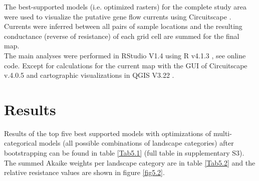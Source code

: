 \documentclass[10pt, twoside]{book} %
\begin{document}
		The best-supported models (i.e. optimized rasters) for the complete study area were used to visualize the putative gene flow currents using Circuitscape \citep{mcrae2013, kimmig2020}. Currents were inferred between all pairs of sample locations and the resulting conductance (reverse of resistance) of each grid cell are summed for the final map.\\
		
		The main analyses were performed in RStudio V1.4 \citep{rstudioteam2022} using R v4.1.3 \citep{rcoreteam2020}, see online code. Except for calculations for the current map with the GUI of Circuitscape v.4.0.5 \citep{mcrae2013} and cartographic visualizations in QGIS V3.22 \citep{qgisdevelopmentteam2020}.\\
		
		
	\section{Results}
	
	Results of the top five best supported models with optimizations of multi-categorical models (all possible combinations of landscape categories) after bootstrapping can be found in table \ref{Tab5.1} (full table in supplementary S3). The summed Akaike weights per landscape category are in table \ref{Tab5.2} and the relative resistance values are shown in figure \ref{fig5.2}.\\
	
\end{document}
